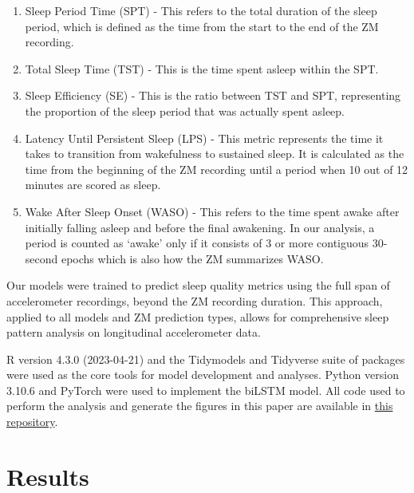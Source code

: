 \documentclass[
  super,
  preprint,
  3p]{elsarticle}
\begin{document}
\begin{enumerate}
\def\labelenumi{\arabic{enumi}.}
\item
  Sleep Period Time (SPT) - This refers to the total duration of the
  sleep period, which is defined as the time from the start to the end
  of the ZM recording.
\item
  Total Sleep Time (TST) - This is the time spent asleep within the SPT.
\item
  Sleep Efficiency (SE) - This is the ratio between TST and SPT,
  representing the proportion of the sleep period that was actually
  spent asleep.
\item
  Latency Until Persistent Sleep (LPS) - This metric represents the time
  it takes to transition from wakefulness to sustained sleep. It is
  calculated as the time from the beginning of the ZM recording until a
  period when 10 out of 12 minutes are scored as sleep.
\item
  Wake After Sleep Onset (WASO) - This refers to the time spent awake
  after initially falling asleep and before the final awakening. In our
  analysis, a period is counted as `awake' only if it consists of 3 or
  more contiguous 30-second epochs which is also how the ZM summarizes
  WASO.
\end{enumerate}

Our models were trained to predict sleep quality metrics using the full
span of accelerometer recordings, beyond the ZM recording duration. This
approach, applied to all models and ZM prediction types, allows for
comprehensive sleep pattern analysis on longitudinal accelerometer data.

R version 4.3.0 (2023-04-21)\citep{R-lang} and the
Tidymodels\citep{tidymodels} and Tidyverse\citep{tidyverse} suite of
packages were used as the core tools for model development and analyses.
Python version 3.10.6\citep{10.5555/1593511} and
PyTorch\citep{NEURIPS2019_9015} were used to implement the biLSTM model.
All code used to perform the analysis and generate the figures in this
paper are available in
\href{https://github.com/esbenlykke/sleep_study}{this repository}.

\hypertarget{results}{%
\section{Results}\label{results}}
\end{document}
